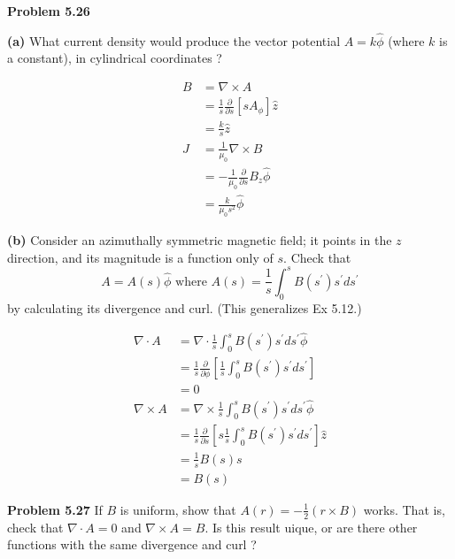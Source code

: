 \documentclass{article}
\begin{document}
\textbf{Problem 5.26}

\textbf{(a)}
What current density would produce the vector potential $A = k \hat{\phi}$ (where $k$ is a constant), in cylindrical coordinates ?

\begin{equation*}
\begin{split}
	B & = \nabla \times A \\
	& = \frac{1}{s} \frac{\partial}{\partial s} [s A_{\phi}] \hat{z} \\
	& = \frac{k}{s} \hat{z} \\
	J & = \frac{1}{\mu_0} \nabla \times B \\
	& = - \frac{1}{\mu_0} \frac{\partial}{\partial s} B_z \hat{\phi} \\
	& = \boxed{\frac{k}{\mu_0 s^2} \hat{\phi}}
\end{split}
\end{equation*}

\textbf{(b)}
Consider an azimuthally symmetric magnetic field; it points in the $z$ direction, and its magnitude is a function only of $s$.
Check that
$$A = A(s) \hat{\phi} \text{ where } A(s) = \frac{1}{s} \int_0^s B(s^\prime) s^\prime ds^\prime$$
by calculating its divergence and curl.
(This generalizes Ex 5.12.)

\begin{equation*}
\begin{split}
	\nabla \cdot A & = \nabla \cdot \frac{1}{s} \int_0^s B(s^\prime) s^\prime ds^\prime \hat{\phi} \\
	& = \frac{1}{s} \frac{\partial}{\partial \phi} [\frac{1}{s} \int_0^s B(s^\prime) s^\prime ds^\prime] \\
	& = \boxed{0} \\
	\nabla \times A & = \nabla \times \frac{1}{s} \int_0^s B(s^\prime) s^\prime ds^\prime \hat{\phi} \\
	& = \frac{1}{s} \frac{\partial}{\partial s} [s \frac{1}{s} \int_0^s B(s^\prime) s^\prime ds^\prime] \hat{z} \\
	& = \frac{1}{s} B(s) s \\
	& = \boxed{B(s)}
\end{split}
\end{equation*}

\textbf{Problem 5.27}
If $B$ is uniform, show that $A(r) = - \frac{1}{2} (r \times B)$ works.
That is, check that $\nabla \cdot A = 0$ and $\nabla \times A = B$.
Is this result uique, or are there other functions with the same divergence and curl ?
\end{document}
